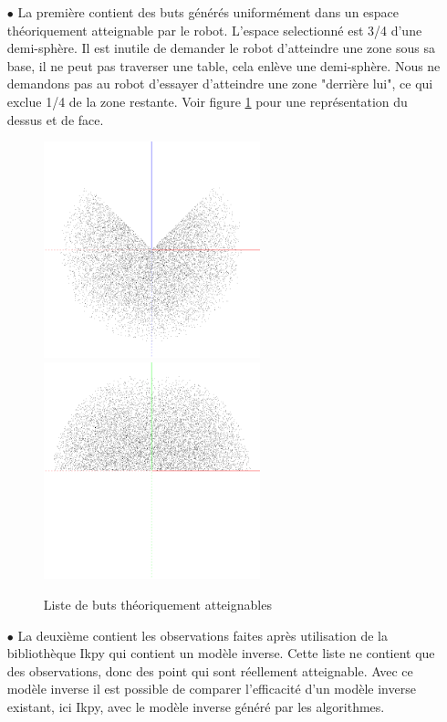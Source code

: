 \documentclass[11pt,french]{report}
\begin{document}
\begin{itemize}
    \item[$\bullet$] La première contient des buts générés uniformément dans un espace théoriquement atteignable par le robot.
L'espace selectionné est 3/4 d'une demi-sphère.
Il est inutile de demander le robot d'atteindre une zone sous sa base, il ne peut pas traverser une table, cela enlève une demi-sphère.
Nous ne demandons pas au robot d'essayer d'atteindre une zone "derrière lui", ce qui exclue 1/4 de la zone restante.
Voir figure \ref{fig:goal_list} pour une représentation du dessus et de face.
    
    \begin{figure}
        \centering
        \includegraphics[width=178pt]{goal_list_top} \includegraphics[width=178pt]{goal_list_front}
        \caption{Liste de buts théoriquement atteignables}
        \label{fig:goal_list}
    \end{figure}
    
    \item[$\bullet$] La deuxième contient les observations faites après utilisation de la bibliothèque Ikpy qui contient un modèle inverse.
Cette liste ne contient que des observations, donc des point qui sont réellement atteignable.
Avec ce modèle inverse il est possible de comparer l'efficacité d'un modèle inverse existant, ici Ikpy, avec le modèle inverse généré par les algorithmes.
\end{itemize}
\end{document}
